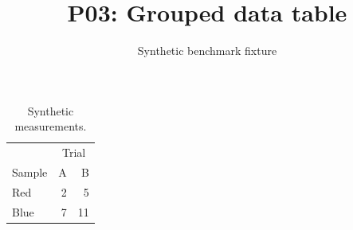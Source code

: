 \documentclass{article}
\title{P03: Grouped data table}
\author{Synthetic benchmark fixture}
\date{}
\begin{document}
\maketitle
\begin{table}[h]\centering
\caption{Synthetic measurements.}
\begin{tabular}{lrr}\hline
 &\multicolumn{2}{c}{Trial}\\
Sample & A & B\\\hline
Red & 2 & 5\\
Blue & 7 & 11\\\hline
\end{tabular}\end{table}
\end{document}
